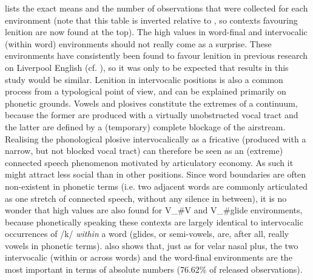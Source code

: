 \largerpage[2]
 lists the exact means and the number of observations that were collected for each environment (note that this table is inverted relative to , so contexts favouring lenition are now found at the top).
The high  values in word-final and intervocalic (within word) environments should not really come as a surprise.
These environments have consistently been found to favour lenition in previous research on Liverpool English (cf. ), so it was only to be expected that results in this study would be similar.
Lenition in intervocalic positions is also a common process from a typological point of view, and can be explained primarily on phonetic grounds. 
Vowels and plosives constitute the extremes of a continuum, because the former are produced with a virtually unobstructed vocal tract and the latter are defined by a (temporary) complete blockage of the airstream.
Realising the phonological plosive intervocalically as a fricative (produced with a narrow, but not blocked vocal tract) can therefore be seen as an (extreme) connected speech phenomenon motivated by articulatory economy.
As such it might attract less social  than in other positions.
Since word boundaries are often non-existent in phonetic terms (i.e. two adjacent words are commonly articulated as one stretch of connected speech, without any silence in between), it is no wonder that high  values are also found for V\_\#V and V\_\#glide environments, because phonetically speaking these contexts are largely identical to intervocalic occurrences of /k/ \emph{within} a word (glides, or semi-vowels, are, after all, really vowels in phonetic terms).
 also shows that, just as for velar nasal plus, the two intervocalic (within or across words) and the word-final environments are the most important in terms of absolute numbers (76.62\% of released observations).

